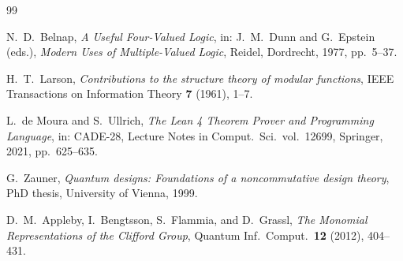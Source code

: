 \documentclass[12pt,a4paper]{article}
\begin{document}
\begin{thebibliography}{99}

N.\ D.\ Belnap,
\textit{A Useful Four-Valued Logic},
in: J.\ M.\ Dunn and G.\ Epstein (eds.), \textit{Modern Uses of Multiple-Valued Logic},
Reidel, Dordrecht, 1977, pp.\ 5--37.

H.\ T.\ Larson,
\textit{Contributions to the structure theory of modular functions},
IEEE Transactions on Information Theory \textbf{7} (1961), 1--7.

L.\ de Moura and S.\ Ullrich,
\textit{The Lean 4 Theorem Prover and Programming Language},
in: CADE-28, Lecture Notes in Comput.\ Sci.\ vol.\ 12699, Springer, 2021, pp.\ 625--635.

G.\ Zauner,
\textit{Quantum designs: Foundations of a noncommutative design theory},
PhD thesis, University of Vienna, 1999.

D.\ M.\ Appleby, I.\ Bengtsson, S.\ Flammia, and D.\ Grassl,
\textit{The Monomial Representations of the Clifford Group},
Quantum Inf.\ Comput.\ \textbf{12} (2012), 404--431.

\end{thebibliography}
\end{document}
